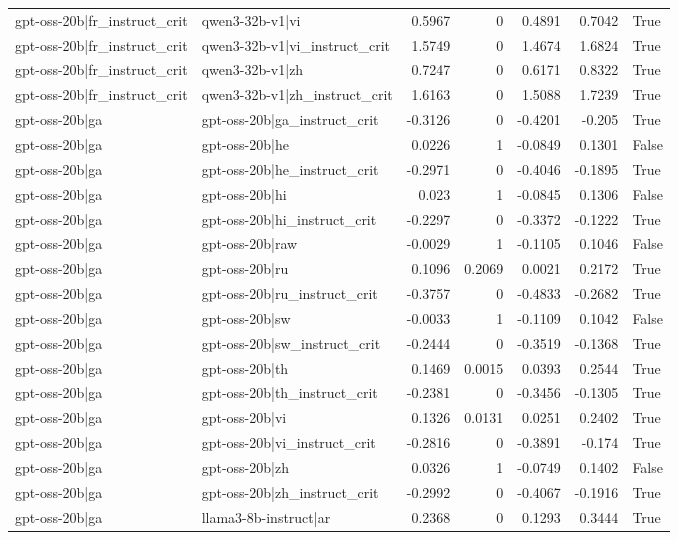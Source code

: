 \begin{table}
\begin{tabular}{l l r r r r l}
gpt-oss-20b|fr_instruct_crit & qwen3-32b-v1|vi & 0.5967 & 0 & 0.4891 & 0.7042 & True \\
gpt-oss-20b|fr_instruct_crit & qwen3-32b-v1|vi_instruct_crit & 1.5749 & 0 & 1.4674 & 1.6824 & True \\
gpt-oss-20b|fr_instruct_crit & qwen3-32b-v1|zh & 0.7247 & 0 & 0.6171 & 0.8322 & True \\
gpt-oss-20b|fr_instruct_crit & qwen3-32b-v1|zh_instruct_crit & 1.6163 & 0 & 1.5088 & 1.7239 & True \\
gpt-oss-20b|ga & gpt-oss-20b|ga_instruct_crit & -0.3126 & 0 & -0.4201 & -0.205 & True \\
gpt-oss-20b|ga & gpt-oss-20b|he & 0.0226 & 1 & -0.0849 & 0.1301 & False \\
gpt-oss-20b|ga & gpt-oss-20b|he_instruct_crit & -0.2971 & 0 & -0.4046 & -0.1895 & True \\
gpt-oss-20b|ga & gpt-oss-20b|hi & 0.023 & 1 & -0.0845 & 0.1306 & False \\
gpt-oss-20b|ga & gpt-oss-20b|hi_instruct_crit & -0.2297 & 0 & -0.3372 & -0.1222 & True \\
gpt-oss-20b|ga & gpt-oss-20b|raw & -0.0029 & 1 & -0.1105 & 0.1046 & False \\
gpt-oss-20b|ga & gpt-oss-20b|ru & 0.1096 & 0.2069 & 0.0021 & 0.2172 & True \\
gpt-oss-20b|ga & gpt-oss-20b|ru_instruct_crit & -0.3757 & 0 & -0.4833 & -0.2682 & True \\
gpt-oss-20b|ga & gpt-oss-20b|sw & -0.0033 & 1 & -0.1109 & 0.1042 & False \\
gpt-oss-20b|ga & gpt-oss-20b|sw_instruct_crit & -0.2444 & 0 & -0.3519 & -0.1368 & True \\
gpt-oss-20b|ga & gpt-oss-20b|th & 0.1469 & 0.0015 & 0.0393 & 0.2544 & True \\
gpt-oss-20b|ga & gpt-oss-20b|th_instruct_crit & -0.2381 & 0 & -0.3456 & -0.1305 & True \\
gpt-oss-20b|ga & gpt-oss-20b|vi & 0.1326 & 0.0131 & 0.0251 & 0.2402 & True \\
gpt-oss-20b|ga & gpt-oss-20b|vi_instruct_crit & -0.2816 & 0 & -0.3891 & -0.174 & True \\
gpt-oss-20b|ga & gpt-oss-20b|zh & 0.0326 & 1 & -0.0749 & 0.1402 & False \\
gpt-oss-20b|ga & gpt-oss-20b|zh_instruct_crit & -0.2992 & 0 & -0.4067 & -0.1916 & True \\
gpt-oss-20b|ga & llama3-8b-instruct|ar & 0.2368 & 0 & 0.1293 & 0.3444 & True \\

\end{tabular}
\end{table}
